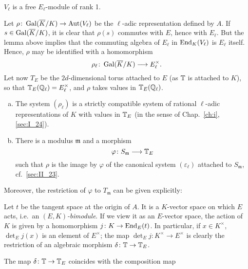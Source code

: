 \begin{lem}
	$V_\ell$ is a free $E_\ell$-module of rank 1.
\end{lem}

Let $\rho\colon \operatorname{Gal}(\overline{K}/K) \to \operatorname{Aut}(V_\ell)$ be the $\ell$-adic
representation defined by $A$. If $s \in \operatorname{Gal}(\overline{K}/K)$, it is clear that
$\rho(s)$ commutes with $E$, hence with $E_\ell$. But the lemma above implies
that the commuting algebra of $E_\ell$ in $\operatorname{End}_K(V_\ell)$ is $E_\ell$ itself.
Hence, $\rho$ may be identified with a homomorphism
\[
	\rho_\ell\colon \operatorname{Gal}(\overline{K}/K) \longrightarrow E^\times_\ell.
\]
Let now $T_E$ be the $2d$-dimensional torus attached to $E$ (as $\mathbb{T}$ is
attached to $K$), so that $\mathbb{T}_E(\mathbb{Q}_\ell) = E_\ell^\times$, and $\rho$ takes
values in $\mathbb{T}_E(\mathbb{Q}_\ell)$.

\begin{thm}\label{thm:II_28_1}
\begin{enumerate}[(a)]
\item\label{thm:II_28_1a}
	The system $(\rho_\ell)$ is a strictly compatible system of rational
	$\ell$-adic representations of $K$ with values in $\mathbb{T}_E$ (in the sense
	\dpage
	of Chap.~\ref{ch:i}, \ref{sec:I_24}).
\item\label{thm:II_28_1b}
	There is a modulus $\mathfrak{m}$ and a morphism
	\[
		\varphi \colon S_{\mathfrak{m}} \longrightarrow \mathbb{T}_E
	\]
	such that $\rho$ is the image by $\varphi$ of the canonical system
	$(\varepsilon_\ell)$ attached to $S_{\mathfrak{m}}$, cf.\ 
	\ref{sec:II_23}.
\end{enumerate}
\end{thm}

Moreover, the restriction of $\varphi$ to $T_{\mathfrak{m}}$ can be given
explicitly:

Let $t$ be the tangent space at the origin of $A$. It is a $K$-vector space on
which $E$ acts, i.e.\ an \emph{$(E, K)$-bimodule}. If we view it as an
$E$-vector space, the action of $K$ is given by a homomorphism $j\colon K \to
\operatorname{End}_E(t)$. In particular, if $x \in K^\times$, $\det_E j(x)$ is an element of
$E^\times$; the map $\det_E j\colon K^\times \to E^\times$ is clearly the
restriction of an algebraic morphism $\delta\colon \mathbb{T} \to \mathbb{T}_E$.

\begin{thm}\label{thm:II_28_2}
The map $\delta\colon \mathbb{T} \to \mathbb{T}_E$ coincides with the composition
map 
\end{thm}

